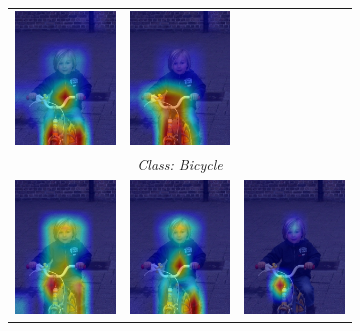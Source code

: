 \begin{figure}[!t]
{\begin{minipage}{0.9\textwidth}
\begin{subfigure}[t]{0.48\textwidth}
\begin{tabular}{c c c}
          \includegraphics[width=0.32\linewidth, height=0.32\linewidth]{figures/cams/layercam/2009_001718_1} &
          \includegraphics[width=0.32\linewidth, height=0.32\linewidth]{figures/cams/gradcampp/2009_001718_1} \\
          \multicolumn{3}{c}{{\scriptsize \textit{Class: Bicycle}}} \\[2pt]
          \includegraphics[width=0.32\linewidth, height=0.32\linewidth]{figures/cams/gradcam/2009_001718_14} &
          \includegraphics[width=0.32\linewidth, height=0.32\linewidth]{figures/cams/layercam/2009_001718_14} &
          \includegraphics[width=0.32\linewidth, height=0.32\linewidth]{figures/cams/gradcampp/2009_001718_14} \\

\end{tabular}
\end{subfigure}
\end{minipage}}
\end{figure}
